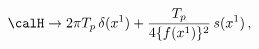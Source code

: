 \begin{equation}
 \calH \to 2\pi T_{p}\,\delta(x^1)
    +\frac{T_p}{4\{f(x^1)\}^2}\,s(x^1)\,,\label{Hdensity}
\end{equation}

